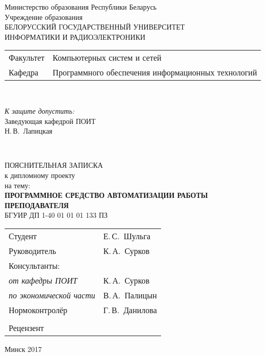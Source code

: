 \begin{titlepage}
  \begin{center}
    Министерство образования Республики Беларусь\\[1em]
    Учреждение образования\\
    БЕЛОРУССКИЙ ГОСУДАРСТВЕННЫЙ УНИВЕРСИТЕТ \\
    ИНФОРМАТИКИ И РАДИОЭЛЕКТРОНИКИ\\[1em]

    \begin{minipage}{\textwidth}
      \begin{flushleft}
        \begin{tabular}{ l l }
          Факультет & Компьютерных систем и сетей\\
          Кафедра   & Программного обеспечения информационных технологий
        \end{tabular}
      \end{flushleft}
    \end{minipage}\\[3em]

    \begin{flushright}
      \begin{minipage}{0.4\textwidth}
        \textit{К защите допустить:}\\[0.8em]
        Заведующая кафедрой ПОИТ\\[0.45em]
        \underline{\hspace*{2.8cm}} Н.\,В.~Лапицкая
      \end{minipage}\\[2.2em]
    \end{flushright}

    {ПОЯСНИТЕЛЬНАЯ ЗАПИСКА}\\
    {к дипломному проекту}\\
    {на тему:}\\[1em]
    \textbf{\large\MakeUppercase{Программное средство автоматизации работы преподавателя}}\\[1em]


    {БГУИР ДП 1-40 01 01 01 133 ПЗ}\\[2em]
    
    \begin{tabular}{ p{}p{} }
      Студент & Е.\,С.~Шульга \\
      Руководитель & К.\,А.~Сурков \\
      Консультанты: &\\
      \hspace*{3ex}\emph{от кафедры ПОИТ} & К.\,А.~Сурков \\
      \hspace*{3ex}\emph{по экономической части} & В.\,А.~Палицын \\
      Нормоконтролёр & Г.\,В.~Данилова\\
      & \\
      Рецензент &
    \end{tabular}
    
    \vfill
    {\normalsize Минск 2017}
  \end{center}
\end{titlepage}
